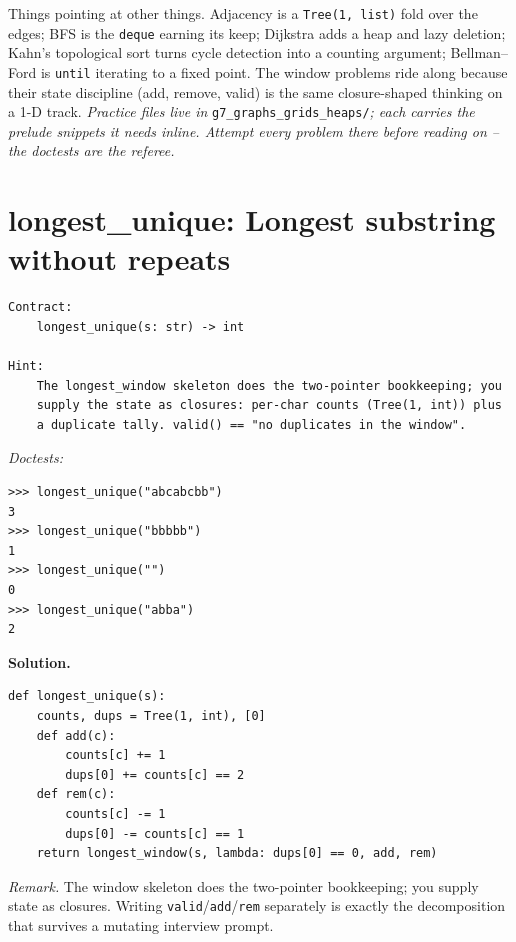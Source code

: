 \documentclass[11pt,letterpaper]{book}
\begin{document}
Things pointing at other things. Adjacency is a \texttt{Tree(1, list)} fold
over the edges; BFS is the \texttt{deque} earning its keep; Dijkstra adds a
heap and lazy deletion; Kahn's topological sort turns cycle detection into a
counting argument; Bellman--Ford is \texttt{until} iterating to a fixed point.
The window problems ride along because their state discipline (add, remove,
valid) is the same closure-shaped thinking on a 1-D track.
\medskip\noindent\textit{Practice files live in }\texttt{g7\_graphs\_grids\_heaps/}\textit{;
each carries the prelude snippets it needs inline. Attempt every problem there
before reading on -- the doctests are the referee.}

\section{longest\_unique: Longest substring without repeats}
\begin{lstlisting}[style=spec]
Contract:
    longest_unique(s: str) -> int

Hint:
    The longest_window skeleton does the two-pointer bookkeeping; you
    supply the state as closures: per-char counts (Tree(1, int)) plus
    a duplicate tally. valid() == "no duplicates in the window".
\end{lstlisting}
\noindent\textit{Doctests:}
\begin{lstlisting}[style=spec]
>>> longest_unique("abcabcbb")
3
>>> longest_unique("bbbbb")
1
>>> longest_unique("")
0
>>> longest_unique("abba")
2
\end{lstlisting}
\noindent\textbf{Solution.}
\begin{lstlisting}[style=code]
def longest_unique(s):
    counts, dups = Tree(1, int), [0]
    def add(c):
        counts[c] += 1
        dups[0] += counts[c] == 2
    def rem(c):
        counts[c] -= 1
        dups[0] -= counts[c] == 1
    return longest_window(s, lambda: dups[0] == 0, add, rem)
\end{lstlisting}

\noindent\textit{Remark.} The window skeleton does the two-pointer bookkeeping;
you supply state as closures. Writing \texttt{valid}/\texttt{add}/\texttt{rem}
separately is exactly the decomposition that survives a mutating interview
prompt.
\end{document}
